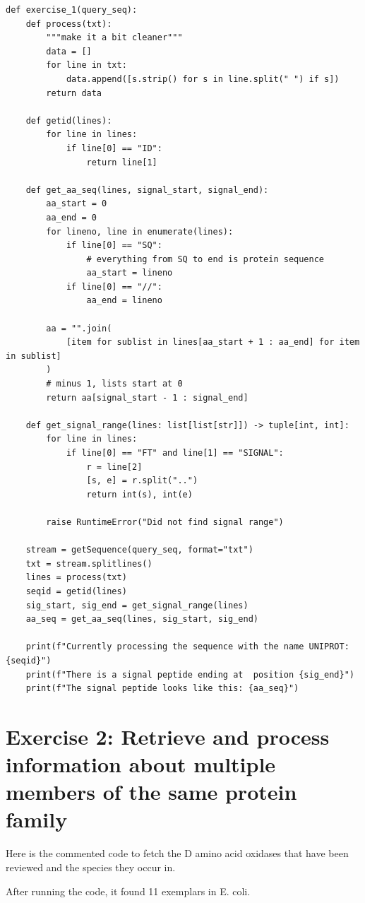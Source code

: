 \documentclass{article} %
\begin{document}
\begin{verbatim}
def exercise_1(query_seq):
    def process(txt):
        """make it a bit cleaner"""
        data = []
        for line in txt:
            data.append([s.strip() for s in line.split(" ") if s])
        return data

    def getid(lines):
        for line in lines:
            if line[0] == "ID":
                return line[1]

    def get_aa_seq(lines, signal_start, signal_end):
        aa_start = 0
        aa_end = 0
        for lineno, line in enumerate(lines):
            if line[0] == "SQ":
                # everything from SQ to end is protein sequence
                aa_start = lineno
            if line[0] == "//":
                aa_end = lineno

        aa = "".join(
            [item for sublist in lines[aa_start + 1 : aa_end] for item in sublist]
        )
        # minus 1, lists start at 0
        return aa[signal_start - 1 : signal_end]

    def get_signal_range(lines: list[list[str]]) -> tuple[int, int]:
        for line in lines:
            if line[0] == "FT" and line[1] == "SIGNAL":
                r = line[2]
                [s, e] = r.split("..")
                return int(s), int(e)

        raise RuntimeError("Did not find signal range")

    stream = getSequence(query_seq, format="txt")
    txt = stream.splitlines()
    lines = process(txt)
    seqid = getid(lines)
    sig_start, sig_end = get_signal_range(lines)
    aa_seq = get_aa_seq(lines, sig_start, sig_end)

    print(f"Currently processing the sequence with the name UNIPROT:{seqid}")
    print(f"There is a signal peptide ending at  position {sig_end}")
    print(f"The signal peptide looks like this: {aa_seq}")
\end{verbatim}

\section{Exercise 2: Retrieve and process information about multiple members of the same protein family}

Here is the commented code to fetch the D amino acid oxidases that have been reviewed and the species they occur in.

After running the code, it found 11 exemplars in E. coli.
\end{document}
